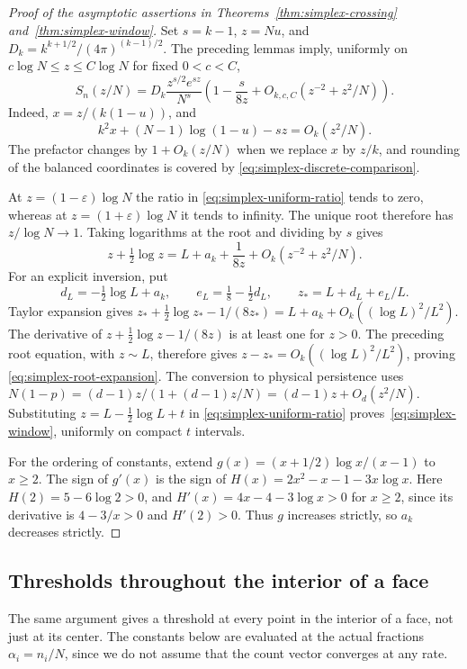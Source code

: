 \begin{proof}[Proof of the asymptotic assertions in
Theorems~\ref{thm:simplex-crossing} and~\ref{thm:simplex-window}]
Set $s=k-1$, $z=Nu$, and $D_k=k^{k+1/2}/(4\pi)^{(k-1)/2}$.
The preceding lemmas imply, uniformly on
$c\log N\le z\le C\log N$ for fixed $0<c<C$,
\begin{equation}\label{eq:simplex-uniform-ratio}
S_n(z/N)=D_k\frac{z^{s/2}e^{sz}}{N^s}
\left(1-\frac{s}{8z}+O_{k,c,C}(z^{-2}+z^2/N)\right).
\end{equation}
Indeed, $x=z/(k(1-u))$, and
\[
k^2x+(N-1)\log(1-u)-sz=O_k(z^2/N).
\]
The prefactor changes by $1+O_k(z/N)$ when we replace $x$ by $z/k$, and
rounding of the balanced coordinates is covered by
\eqref{eq:simplex-discrete-comparison}.

At $z=(1-\varepsilon)\log N$ the ratio in
\eqref{eq:simplex-uniform-ratio} tends to zero, whereas at
$z=(1+\varepsilon)\log N$ it tends to infinity. The unique root therefore
has $z/\log N\to1$. Taking logarithms at the root and dividing by $s$ gives
\[
z+\tfrac12\log z=L+a_k+\frac1{8z}+O_k(z^{-2}+z^2/N).
\]
For an explicit inversion, put
\[
d_L=-\tfrac12\log L+a_k,\qquad e_L=\tfrac18-\tfrac12d_L,
\qquad z_*=L+d_L+e_L/L.
\]
Taylor expansion gives
$z_*+\tfrac12\log z_*-1/(8z_*)=L+a_k+
O_k((\log L)^2/L^2)$. The derivative of
$z+\tfrac12\log z-1/(8z)$ is at least one for $z>0$.
The preceding root equation, with $z\sim L$, therefore gives
$z-z_*=O_k((\log L)^2/L^2)$, proving
\eqref{eq:simplex-root-expansion}. The conversion to physical persistence
uses $N(1-p)=(d-1)z/(1+(d-1)z/N)=(d-1)z+O_d(z^2/N)$.
Substituting $z=L-\tfrac12\log L+t$ in
\eqref{eq:simplex-uniform-ratio} proves~\eqref{eq:simplex-window}, uniformly
on compact $t$ intervals.

For the ordering of constants, extend
$g(x)=(x+1/2)\log x/(x-1)$ to $x\ge2$.
The sign of $g'(x)$ is the sign of
$H(x)=2x^2-x-1-3x\log x$.
Here $H(2)=5-6\log2>0$, and
$H'(x)=4x-4-3\log x>0$ for $x\ge2$, since its derivative is
$4-3/x>0$ and $H'(2)>0$. Thus $g$ increases strictly, so $a_k$ decreases
strictly.
\end{proof}

\subsection{Thresholds throughout the interior of a face}

The same argument gives a threshold at every point in the interior of a
face, not just at its center. The constants below are evaluated at the
actual fractions $\alpha_i=n_i/N$, since we do not assume that the count
vector converges at any rate.

